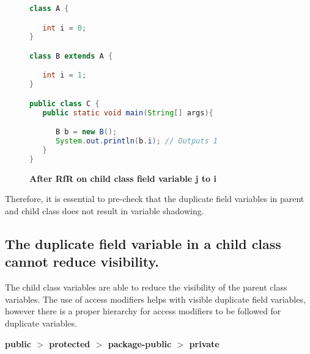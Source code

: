 \begin{figure}[th]
\centering
\begin{minipage}[t]{0.75\linewidth}
\begin{lstlisting}[language=java, basicstyle=\scriptsize\ttfamily,frame=single]
class A {

   int i = 0;
}

class B extends A {

   int i = 1; 
}

public class C {
   public static void main(String[] args){

      B b = new B();
      System.out.println(b.i); // Outputs 1
   }
}
\end{lstlisting}
\end{minipage}
\caption{\textbf{After RfR on child class field variable j to i}}
\label{figure:afterRfR}
\end{figure}

Therefore, it is essential to pre-check that the duplicate field variables in parent and child class does not result in variable shadowing. 

\subsection{The duplicate field variable in a child class cannot reduce visibility.}

The child class variables are able to reduce the visibility of the parent class variables. The use of access modifiers helps with visible duplicate field variables, however there is a proper hierarchy for access modifiers to be followed for duplicate variables.

\textbf{public $>$ protected $>$ package-public $>$ private}

